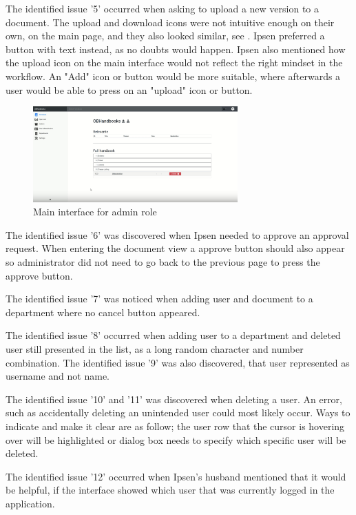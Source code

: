 The identified issue '5' occurred when asking to upload a new version to a document.
The upload and download icons were not intuitive enough on their own, on the main page, and they also looked similar, see .
Ipsen preferred a button with text instead, as no doubts would happen.
Ipsen also mentioned how the upload icon on the main interface would not reflect the right mindset in the workflow.
An "Add" icon or button would be more suitable, where afterwards a user would be able to press on an "upload" icon or button.

\begin{figure}[H]
	\centering
		\includegraphics[width=0.7\textwidth]{billeder/MainInterfaceAdmin.png}
	\caption{Main interface for admin role}\label{fig:MainInterfaceAdmin}
\end{figure}

The identified issue '6' was discovered when Ipsen needed to approve an approval request.
When entering the document view a approve button should also appear so administrator did not need to go back to the previous page to press the approve button.

The identified issue '7' was noticed when adding user and document to a department where no cancel button appeared.

The identified issue '8' occurred when adding user to a department and deleted user still presented in the list, as a long random character and number combination.
The identified issue '9' was also discovered, that user represented as username and not name.

The identified issue '10'  and '11' was discovered when deleting a user.
An error, such as accidentally deleting an unintended user could most likely occur.
Ways to indicate and make it clear are as follow; the user row that the cursor is hovering over will be highlighted or dialog box needs to specify which specific user will be deleted.

The identified issue '12' occurred when Ipsen's husband mentioned that it would be helpful, if the interface showed which user that was currently logged in the application.


